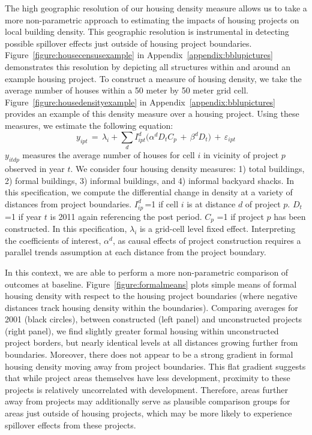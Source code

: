 \documentclass[12pt]{article}
\begin{document}
The high geographic resolution of our housing density measure allows us to take a more non-parametric approach to estimating the impacts of housing projects on local building density.  This geographic resolution is instrumental in detecting possible spillover effects just outside of housing project boundaries.  Figure~\ref{figure:housecensusexample} in Appendix~\ref{appendix:bblupictures} demonstrates this resolution by depicting all structures within and around an example housing project.  To construct a measure of housing density, we take the average number of houses within a 50 meter by 50 meter grid cell.  Figure~\ref{figure:housedensityexample} in Appendix~\ref{appendix:bblupictures} provides an example of this density measure over a housing project.  Using these measures, we estimate the following equation:
\begin{equation}
\label{equation:bblu}
y_{ipt} \, = \, \lambda_i + \sum\limits_{d} I^d_{ipt}\Big( \alpha^d D_tC_p \, + \, \beta^dD_t\Big) \, + \, \varepsilon_{ipt}
\end{equation}
$y_{itdp}$ measures the average number of houses for cell $i$ in vicinity of project $p$ observed in year $t$.  We consider four housing density measures: 1) total buildings, 2) formal buildings, 3) informal buildings, and 4) informal backyard shacks.  In this specification, we compute the differential change in density at a variety of distances from project boundaries.  $I^d_{ip}$\,=1 if cell $i$ is at distance $d$ of project $p$.  $D_{t}\,\,$=1 if year $t$ is 2011 again referencing the post period.  $C_{p}\,\,$=1 if project $p$ has been constructed.  In this specification, $\lambda_i$ is a grid-cell level fixed effect.  Interpreting the coefficients of interest, $\alpha^d$, as causal effects of project construction requires a parallel trends assumption at each distance from the project boundary.  

In this context, we are able to perform a more non-parametric comparison of outcomes at baseline.  Figure~\ref{figure:formalmeans} plots simple means of formal housing density with respect to the housing project boundaries (where negative distances track housing density within the boundaries).  Comparing averages for 2001 (black circles), between constructed (left panel) and unconstructed projects (right panel), we find slightly greater formal housing within unconstructed project borders, but nearly identical levels at all distances growing further from boundaries.  Moreover, there does not appear to be a strong gradient in formal housing density moving away from project boundaries.  This flat gradient suggests that while project areas themselves have less development, proximity to these projects is relatively uncorrelated with development.  Therefore, areas further away from projects may additionally serve as plausible comparison groups for areas just outside of housing projects, which may be more likely to experience spillover effects from these projects.
\end{document}
